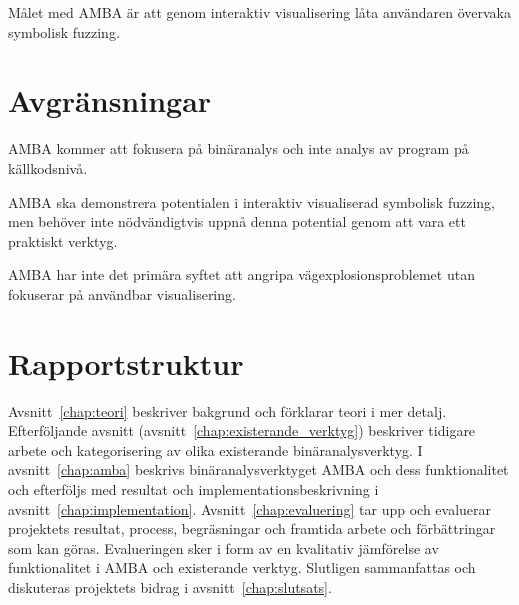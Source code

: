Målet med AMBA är att genom interaktiv visualisering låta användaren övervaka
symbolisk fuzzing.

\section{Avgränsningar}

AMBA kommer att fokusera på binäranalys och inte analys av program på
källkodsnivå.

AMBA ska demonstrera potentialen i interaktiv visualiserad symbolisk fuzzing,
men behöver inte nödvändigtvis uppnå denna potential genom att vara ett
praktiskt verktyg.

AMBA har inte det primära syftet att angripa vägexplosionsproblemet utan
fokuserar på användbar visualisering.

\section{Rapportstruktur}

Avsnitt~\ref{chap:teori} beskriver bakgrund och förklarar teori i mer detalj.
Efterföljande avsnitt (avsnitt~\ref{chap:existerande_verktyg}) beskriver
tidigare arbete och kategorisering av olika existerande binäranalysverktyg. I
avsnitt~\ref{chap:amba} beskrivs binäranalysverktyget AMBA och dess
funktionalitet och efterföljs med resultat och implementationsbeskrivning i
avsnitt~\ref{chap:implementation}. Avsnitt~\ref{chap:evaluering} tar upp och
evaluerar projektets resultat, process, begräsningar och framtida arbete och
förbättringar som kan göras. Evalueringen sker i form av en kvalitativ
jämförelse av funktionalitet i AMBA och existerande verktyg. Slutligen
sammanfattas och diskuteras projektets bidrag i avsnitt~\ref{chap:slutsats}.
